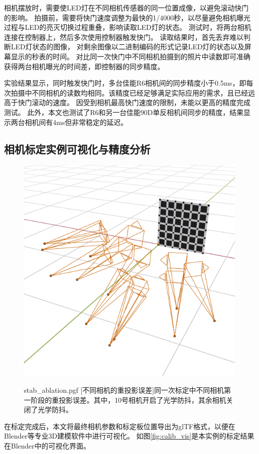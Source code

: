 相机摆放时，需要使LED灯在不同相机传感器的同一位置成像，以避免滚动快门的影响。
拍摄前，需要将快门速度调整为最快的1/4000秒，以尽量避免相机曝光过程与LED的亮灭切换过程重叠，影响读取LED灯的状态。
测试时，将两台相机连接在控制器上，然后多次使用控制器触发快门。
读取结果时，首先丢弃难以判断LED灯状态的图像，
对剩余图像以二进制编码的形式记录LED灯的状态以及屏幕显示的秒表的时间。
对比同一次快门中不同相机拍摄到的照片中读数即可准确获得两台相机曝光的时间差，即控制器的同步精度。

实验结果显示，同时触发快门时，多台佳能R6相机间的同步精度小于0.5ms，即每次拍摄中不同相机的读数均相同。该精度已经足够满足实际应用的需求，且已经远高于快门滚动的速度。
因受到相机最高快门速度的限制，未能以更高的精度完成测试。
此外，本文也测试了R6和另一台佳能90D单反相机间同步的精度，结果显示两台相机间有4ms但非常稳定的延迟。

\subsection{相机标定实例可视化与精度分析}

\begin{figure}
    \begin{minipage}{0.38\textwidth}
        \centering
        \includegraphics[width=\textwidth]{figures/calib_vis}
        \label{fig:calib_vis}
    \end{minipage}\hfill%
    \begin{minipage}{0.6\textwidth}
        \centering
        {stab_ablation.pgf}
        [不同相机的重投影误差]{同一次标定中不同相机第一阶段的重投影误差。其中，10号相机开启了光学防抖，其余相机关闭了光学防抖。}
        \label{fig:stablize_ablation}
    \end{minipage}%
\end{figure}
在标定完成后，本文将最终相机参数和标定板位置导出为glTF格式，以便在Blender等专业3D建模软件中进行可视化。
如图\ref{fig:calib_vis}是本实例的标定结果在Blender中的可视化界面。

